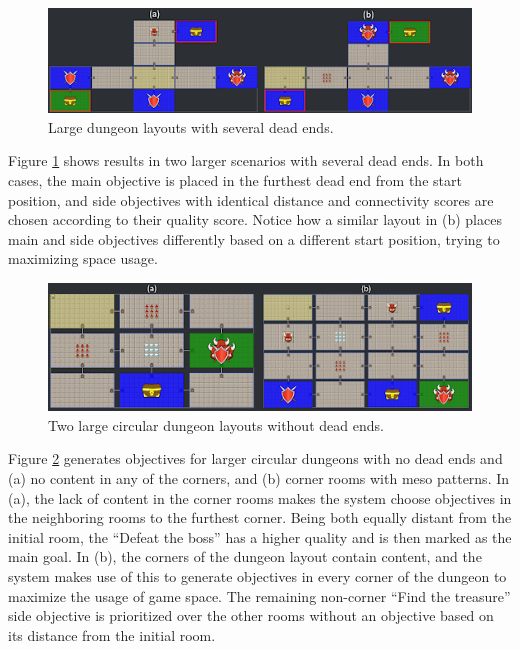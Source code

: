 \begin{figure}[h]
  \centering
  \includegraphics[width=\columnwidth]{included-papers-tex/paper-7/Figures/results4.png}
  \caption{Large dungeon layouts with several dead ends.}
  \label{fig:oldfig8}
\end{figure}

Figure \ref{fig:oldfig8} shows results in two larger scenarios with several dead ends. In both cases, the main objective is placed in the furthest dead end from the start position, and side objectives with identical distance and connectivity scores are chosen according to their quality score. Notice how a similar layout in (b) places main and side objectives differently based on a different start position, trying to maximizing space usage.

\begin{figure}[h]
  \centering
  \includegraphics[width=\columnwidth]{included-papers-tex/paper-7/Figures/results5.png}
  \caption{Two large circular dungeon layouts without dead ends.}
  \label{fig:oldfig9}
\end{figure}

Figure \ref{fig:oldfig9} generates objectives for larger circular dungeons with no dead ends and (a) no content in any of the corners, and (b) corner rooms with meso patterns. In (a), the lack of content in the corner rooms makes the system choose objectives in the neighboring rooms to the furthest corner. Being both equally distant from the initial room, the “Defeat the boss” has a higher quality and is then marked as the main goal. In (b), the corners of the dungeon layout contain content, and the system makes use of this to generate objectives in every corner of the dungeon to maximize the usage of game space. The remaining non-corner “Find the treasure” side objective is prioritized over the other rooms without an objective based on its distance from the initial room.

